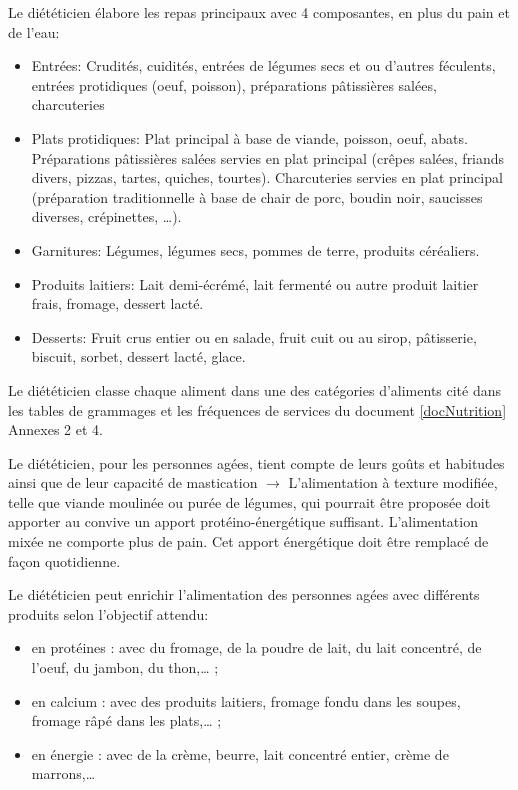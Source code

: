 Le diététicien élabore les repas principaux avec 4 composantes, en plus du pain et de l'eau:
\begin{itemize}
 \item Entrées: Crudités, cuidités, entrées de légumes secs et ou d’autres féculents, entrées protidiques (oeuf, poisson), préparations pâtissières salées, charcuteries
 \item Plats protidiques: Plat principal à base de viande, poisson, oeuf, abats. Préparations pâtissières salées servies en plat principal (crêpes salées, friands divers, pizzas, tartes, quiches, tourtes). Charcuteries servies en plat principal (préparation traditionnelle à base de chair de porc, boudin noir, saucisses diverses, crépinettes, …).
 \item Garnitures: Légumes, légumes secs, pommes de terre, produits céréaliers.
 \item Produits laitiers: Lait demi-écrémé, lait fermenté ou autre produit laitier frais, fromage, dessert lacté.
 \item Desserts: Fruit crus entier ou en salade, fruit cuit ou au sirop, pâtisserie, biscuit, sorbet, dessert lacté, glace.
\end{itemize}

Le diététicien classe chaque aliment dans une des catégories d'aliments cité dans les tables de grammages et les fréquences de services du document \ref{docNutrition} Annexes 2 et 4.

Le diététicien, pour les personnes agées, tient compte de leurs goûts et habitudes ainsi que de leur capacité de mastication $\rightarrow$ L’alimentation à texture modifiée, telle que viande moulinée ou purée de légumes, qui pourrait être proposée doit apporter au convive un apport protéino-énergétique suffisant. L’alimentation mixée ne comporte plus de pain. Cet apport énergétique doit être remplacé de façon quotidienne.

Le diététicien peut enrichir l'alimentation des personnes agées avec différents produits selon l'objectif attendu:
\begin{itemize}
 \item en protéines : avec du fromage, de la poudre de lait, du lait concentré, de l’oeuf, du jambon, du thon,… ;
 \item en calcium : avec des produits laitiers, fromage fondu dans les soupes, fromage râpé dans les plats,… ;
 \item en énergie : avec de la crème, beurre, lait concentré entier, crème de marrons,…
\end{itemize}

